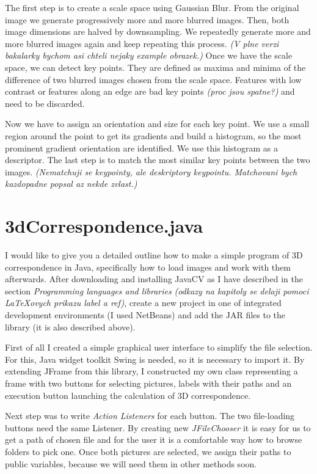 \documentclass[12pt]{article}
\newcommand{\lmv}[1]{\textit{\textcolor{OliveGreen}{(#1)}}}
\begin{document}
	The first step is to create a scale space using Gaussian Blur. From the original image we generate progressively more and more blurred images. Then, both image dimensions are halved by downsampling. We repeatedly generate more and more blurred images again and keep repeating this process. \lmv{V plne verzi bakalarky bychom asi chteli nejaky example obrazek.} Once we have the scale space, we can detect key points. They are defined as maxima and minima of the difference of two blurred images chosen from the scale space. Features with low contrast or features along an edge are bad key points \lmv{proc jsou spatne?} and need to be discarded.
	
	Now we have to assign an orientation and size for each key point. We use a small region around the point to get its gradients and build a histogram, so the most prominent gradient orientation are identified. We use this histogram as a descriptor. The last step is to match the most similar key points between the two images. \lmv{Nematchuji se keypointy, ale deskriptory keypointu. Matchovani bych kazdopadne popsal az nekde zvlast.} 
	
	\section{3dCorrespondence.java}
	I would like to give you a detailed outline how to make a simple program of 3D correspondence in Java, specifically how to load images and work with them afterwards. After downloading and installing JavaCV as I have described in the section {\itshape Programming languages and libraries} \lmv{odkazy na kapitoly se delaji pomoci \LaTeX ovych prikazu label a ref}, create a new project in one of integrated development environments (I used NetBeans) and add the JAR files to the library (it is also described above).
	
	First of all I created a simple graphical user interface to simplify the file selection. For this, Java widget toolkit Swing is needed, so it is necessary to import it. By extending JFrame from this library, I constructed my own class representing a frame with two buttons for selecting pictures, labels with their paths and an execution button launching the calculation of 3D correspondence. 
	
	Next step was to write {\itshape Action Listeners} for each button. The two file-loading buttons need the same Listener. By creating new {\itshape JFileChooser} it is easy for us to get a path of chosen file and for the user it is a comfortable way how to browse folders to pick one. Once both pictures are selected, we assign their paths to public variables, because we will need them in other methods soon. 	
	
\end{document}
